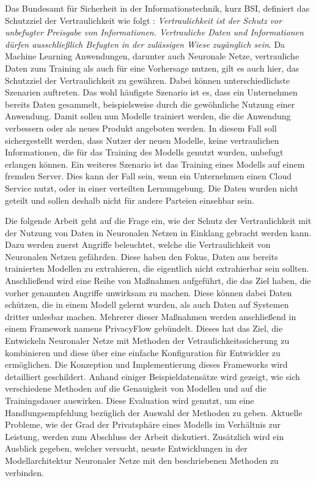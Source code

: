 Das Bundesamt für Sicherheit in der Informationstechnik, kurz BSI, definiert das Schutzziel der Vertraulichkeit wie folgt \cite{bsi_it_grundschutz}: \textit{\dq Vertraulichkeit ist der Schutz vor unbefugter Preisgabe von Informationen. Vertrauliche Daten und Informationen dürfen ausschließlich Befugten in der zulässigen Wiese zugänglich sein\dq}. 
Da Machine Learning Anwendungen, darunter auch Neuronale Netze, vertrauliche Daten zum Training als auch für eine Vorhersage nutzen, gilt es auch hier, das Schutzziel der Vertraulichkeit zu gewähren.
Dabei können unterschiedlichste Szenarien auftreten.
Das wohl häufigste Szenario ist es, dass ein Unternehmen bereits Daten gesammelt, beispielsweise durch die gewöhnliche Nutzung einer Anwendung. 
Damit sollen nun Modelle trainiert werden, die die Anwendung verbessern oder als neues Produkt angeboten werden. 
In diesem Fall soll sichergestellt werden, dass Nutzer der neuen Modelle, keine vertraulichen Informationen, die für das Training des Modells genutzt wurden, unbefugt erlangen können.
Ein weiteres Szenario ist das Training eines Modells auf einem fremden Server. 
Dies kann der Fall sein, wenn ein Unternehmen einen Cloud Service nutzt, oder in einer verteilten Lernumgebung.
Die Daten wurden nicht geteilt und sollen deshalb nicht für andere Parteien einsehbar sein.

Die folgende Arbeit geht auf die Frage ein, wie der Schutz der Vertraulichkeit mit der Nutzung von Daten in Neuronalen Netzen in Einklang gebracht werden kann.
Dazu werden zuerst Angriffe beleuchtet, welche die Vertraulichkeit von Neuronalen Netzen gefährden.
Diese haben den Fokus, Daten aus bereits trainierten Modellen zu extrahieren, die eigentlich nicht extrahierbar sein sollten.
Anschließend wird eine Reihe von Maßnahmen aufgeführt, die das Ziel haben, die vorher genannten Angriffe unwirksam zu machen.
Diese können dabei Daten schützen, die in einem Modell gelernt wurden, als auch Daten auf Systemen dritter unlesbar machen.
Mehrerer dieser Maßnahmen werden anschließend in einem Framework namens PrivacyFlow gebündelt.
Dieses hat das Ziel, die Entwickeln Neuronaler Netze mit Methoden der Vetraulichkeitssicherung zu kombinieren und diese über eine einfache Konfiguration für Entwickler zu ermöglichen.
Die Konzeption und Implementierung dieses Frameworks wird detailliert geschildert.
Anhand einiger Beispieldatensätze wird gezeigt, wie sich verschiedene Methoden auf die Genauigkeit von Modellen und auf die Trainingsdauer auswirken.
Diese Evaluation wird genutzt, um eine Handlungsempfehlung bezüglich der Auswahl der Methoden zu geben.
Aktuelle Probleme, wie der Grad der Privatsphäre eines Modells im Verhältnis zur Leistung, werden zum Abschluss der Arbeit diskutiert.
Zusätzlich wird ein Ausblick gegeben, welcher versucht, neuste Entwicklungen in der Modellarchitektur Neuronaler Netze mit den beschriebenen Methoden zu verbinden.

